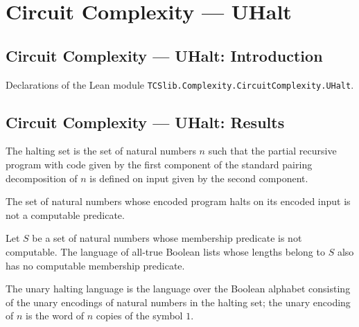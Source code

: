 \section{Circuit Complexity --- UHalt}
\subsection*{Circuit Complexity --- UHalt: Introduction}

Declarations of the Lean module \texttt{TCSlib.Complexity.CircuitComplexity.UHalt}.

\subsection*{Circuit Complexity --- UHalt: Results}

\begin{definition}
\label{Nat.Partrec.Code.haltingSet}
\leanok
The halting set is the set of natural numbers $n$ such that the partial recursive
program with code given by the first component of the standard pairing decomposition of
$n$ is defined on input given by the second component.
\end{definition}

\begin{theorem}
\label{Nat.Partrec.Code.not_computablePred_mem_haltingSet}
\leanok
{}
The set of natural numbers whose encoded program halts on its encoded input is not a
computable predicate.
\end{theorem}

\begin{theorem}
\label{Language.not_computablePred_mem_unary}
\leanok
{}
Let $S$ be a set of natural numbers whose membership predicate is not computable. The
language of all-true Boolean lists whose lengths belong to $S$ also has no computable
membership predicate.
\end{theorem}

\begin{definition}
\label{Language.uhalt}
\leanok
{}
The unary halting language is the language over the Boolean alphabet consisting of the
unary encodings of natural numbers in the halting set; the unary encoding of $n$ is the
word of $n$ copies of the symbol $1$.
\end{definition}

